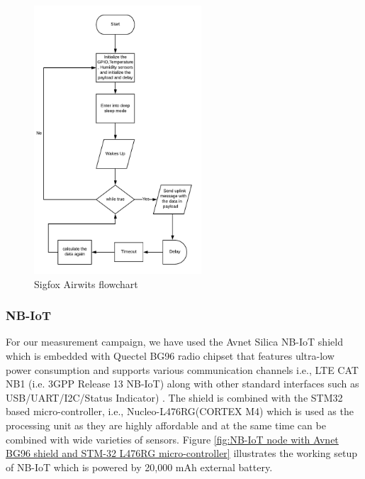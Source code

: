 \documentclass[12pt]{article}
\begin{document}
\begin{figure}[H]
    \centering
    \includegraphics[width=0.9\columnwidth,height=10cm,keepaspectratio]{Images/AirwitsFlowchart.pdf}
    \caption{Sigfox Airwits flowchart}
    \label{fig:Sigfox Airwits flowchart}
\end{figure}



\subsubsection{NB-IoT}\label{NB-IoT experimental setup}
For our measurement campaign, we have used the Avnet Silica NB-IoT shield which is embedded with Quectel BG96 radio chipset that features ultra-low power consumption and supports various communication channels i.e., LTE CAT NB1 (i.e. 3GPP Release 13 NB-IoT) along with other standard interfaces such as USB/UART/I2C/Status Indicator) \cite{avnetBG96}. The shield is combined with the STM32 based micro-controller, i.e., Nucleo-L476RG(CORTEX M4) \cite{STM} which is used as the processing unit as they are highly affordable and at the same time can be combined with wide varieties of sensors. Figure \ref{fig:NB-IoT node with Avnet BG96 shield and STM-32 L476RG micro-controller} illustrates the working setup of NB-IoT which is powered by 20,000 mAh external battery. \par
\end{document}
